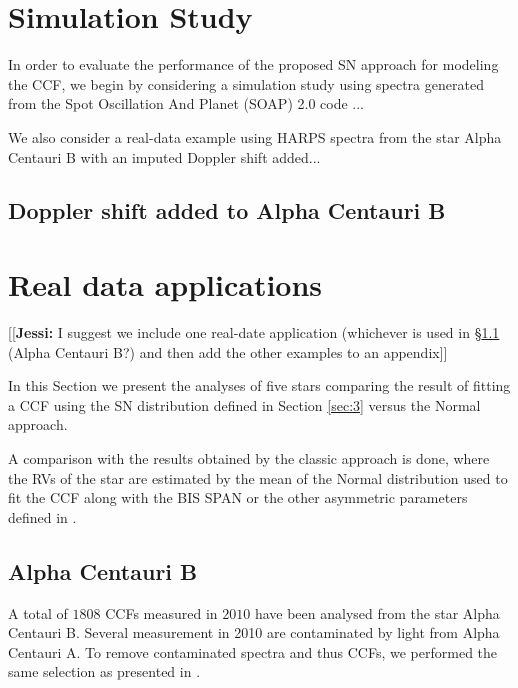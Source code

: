 \documentclass[11pt, oneside]{article}
\newcommand{\jessi}[1]{{\color{Purple}[[\textbf{Jessi: }#1]]}}
\begin{document}
\section{Simulation Study} \label{sec:soap}
In order to evaluate the performance of the proposed SN approach for modeling the CCF, we begin by considering a simulation study using spectra generated from the Spot Oscillation And Planet (SOAP) 2.0 code \citep{Dumusque-2014b}...

We also consider a real-data example using HARPS spectra from the star Alpha Centauri B with an imputed Doppler shift added...

\subsection{Doppler shift added to Alpha Centauri B} \label{sec:soap_real}


\section{Real data applications} \label{sec:4}
\jessi{I suggest we include one real-date application (whichever is used in \S\ref{sec:soap_real} (Alpha Centauri B?) and then add the other examples to an appendix}

In this Section we present the analyses of five stars comparing the result of fitting a CCF using the SN distribution defined in Section \ref{sec:3} versus the Normal approach. 

A comparison with the results obtained by the classic approach is done, where the RVs of the star are estimated by the mean of the Normal distribution used to fit the CCF along with the BIS SPAN or the other asymmetric parameters defined in \citet{Figueira-2013}.

\subsection{Alpha Centauri B} \label{sec:alphacentb}

A total of $1808$ CCFs measured in $2010$ have been analysed from the star Alpha Centauri B. Several measurement in 2010 are contaminated by light from Alpha Centauri A. To remove contaminated spectra and thus CCFs, we performed the same selection as presented in \citet{Dumusque-2012}.
\end{document}
